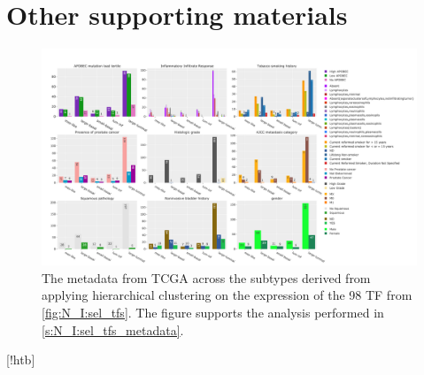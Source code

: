 \section{Other supporting materials}

\begin{figure}
    \centering
    \includegraphics[width=1.0\textwidth,keepaspectratio]{Sections/Network_I/Resources/selective_pruning/sel_tfs/sel_tfs_tcga_meta.png}
      \caption[TCGA metadata and the groups derived from the 98 TF]{The metadata from TCGA \cite{Robertson2017-mg} across the subtypes derived from applying hierarchical clustering on the expression of the 98 TF from \cref{fig:N_I:sel_tfs}. The figure supports the analysis performed in \cref{s:N_I:sel_tfs_metadata}.}
    \label{fig:ap:sel_tfs_tcga_metadata}
\end{figure}[!htb]   


\newpage 




